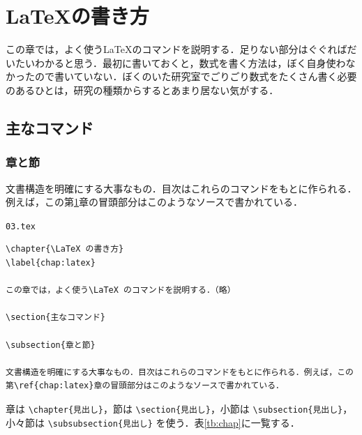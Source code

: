 \chapter{\LaTeX の書き方}
\label{chap:latex}

この章では，よく使う\LaTeX のコマンドを説明する．足りない部分はぐぐればだいたいわかると思う．最初に書いておくと，数式を書く方法は，ぼく自身使わなかったので書いていない．ぼくのいた研究室でごりごり数式をたくさん書く必要のあるひとは，研究の種類からするとあまり居ない気がする．

\section{主なコマンド}

\subsection{章と節}

文書構造を明確にする大事なもの．目次はこれらのコマンドをもとに作られる．例えば，この第\ref{chap:latex}章の冒頭部分はこのようなソースで書かれている．

\begin{itembox}[l]{{\tt 03.tex}}
\begin{verbatim}
\chapter{\LaTeX の書き方}
\label{chap:latex}

この章では，よく使う\LaTeX のコマンドを説明する．（略）

\section{主なコマンド}

\subsection{章と節}

文書構造を明確にする大事なもの．目次はこれらのコマンドをもとに作られる．例えば，この第\ref{chap:latex}章の冒頭部分はこのようなソースで書かれている．
\end{verbatim}
\end{itembox}

章は \verb|\chapter{見出し}|，節は \verb|\section{見出し}|，小節は \verb|\subsection{見出し}|，小々節は \verb|\subsubsection{見出し}| を使う．表\ref{tb:chap}に一覧する．

